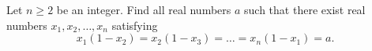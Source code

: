 Let \(n \ge 2\) be an integer. Find all real numbers \(a\) such that there exist real numbers \(x_1,x_2,\dots,x_n\) satisfying
\[x_1(1-x_2)=x_2(1-x_3)=\dots=x_n(1-x_1)=a.\]

